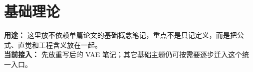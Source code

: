 
\part*{基础理论}
{}

\begin{conceptbox}
\textbf{用途：} 这里放不依赖单篇论文的基础概念笔记，重点不是只记定义，而是把公式、直觉和工程含义放在一起。\\
\textbf{当前接入：} 先放重写后的 VAE 笔记；其它基础主题仍可按需要逐步迁入这个统一入口。
\end{conceptbox}


